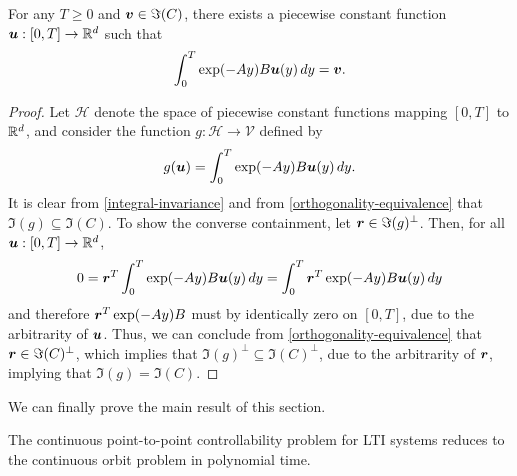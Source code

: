 \begin{proposition}
For any $T \geq 0$ and $\boldsymbol{v} \in \Im(C)$, there exists a piecewise constant function $\boldsymbol{u} : [0, T] \rightarrow \mathbb{R}^{d}$ such that
\begin{equation}
\label{control-existence}
\int_{0}^{T} \exp(-Ay) B \myvector{u}(y) \, dy = \myvector{v}.
\end{equation}
\end{proposition}

\begin{proof}
Let $\mathcal{H}$ denote the space of piecewise constant functions mapping $[0,T]$ to $\mathbb{R}^{d}$, and consider the function $g : \mathcal{H} \rightarrow \mathcal{V}$ defined by
\begin{equation*}
g(\boldsymbol{u}) = \int_{0}^{T} \exp(-Ay) B \boldsymbol{u}(y) \, dy.
\end{equation*}
It is clear from \cref{integral-invariance} and from \cref{orthogonality-equivalence} that $\Im(g) \subseteq \Im(C)$. To show the converse containment, let $\boldsymbol{r} \in \Im(g)^{\perp}$. Then, for all $\boldsymbol{u} : [0,T] \rightarrow \mathbb{R}^{d}$,
\begin{equation*}
0 = \boldsymbol{r}^{T} \int_{0}^{T} \exp(-Ay) B \boldsymbol{u}(y) \, dy = \int_{0}^{T} \boldsymbol{r}^{T} \exp(-Ay) B \boldsymbol{u}(y) \, dy
\end{equation*}
and therefore $\boldsymbol{r}^{T} \exp(-Ay) B$ must by identically zero on $[0,T]$, due to the arbitrarity of $\boldsymbol{u}$. Thus, we can conclude from \cref{orthogonality-equivalence} that $\boldsymbol{r} \in \Im(C)^{\perp}$, which implies that $\Im(g)^{\perp} \subseteq \Im(C)^{\perp}$, due to the arbitrarity of $\boldsymbol{r}$, implying that $\Im(g) = \Im(C)$.
\end{proof}

We can finally prove the main result of this section.

\begin{theorem}
The continuous point-to-point controllability problem for LTI systems reduces to the continuous orbit problem in polynomial time.
\end{theorem}

